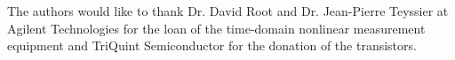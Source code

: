 The authors would like to thank Dr. David Root and Dr. Jean-Pierre Teyssier at Agilent Technologies for the loan of the time-domain nonlinear measurement equipment and TriQuint Semiconductor for the donation of the transistors. 




%







